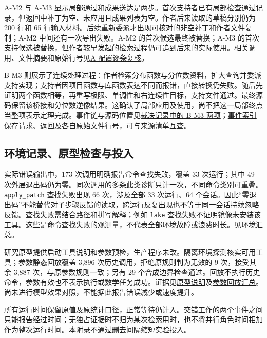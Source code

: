 A-M2 与 A-M3 显示局部通过和成果送达是两步。首次支持者已有局部检查通过记录，但返回中补丁为空、未应用且成果列表为空。作者后来读取的草稿分别仍为 200 行和 65 行输入材料。后续重新委派才出现可核对的非空补丁和作者文件复制；A-M2 中间还有一次导出失败。A-M2 的首次候选最终被替换；A-M3 的首次支持候选被替换，但作者较早发起的检索过程仍可追到后来的实际使用。相关调用、文件摘要和原始行号见\href{research/semantic/review_A.json}{A 配置逐条复核}。

B-M3 则展示了连续处理过程：作者检索分布函数与分位数资料，扩大查询并委派支持实现；支持者因项目函数与库函数表达不同而报错，直接转换仍失败。随后先证明两个函数相等，再重写极限、单调性和右连续性目标，支持文件通过。最终源码保留该桥接和分位数逆像结果。这确认了局部应用及使用，尚不把这一局部终点当整项表示定理完成。事件链与源码位置见\href{research/semantic/adjudicated_annotations.json}{裁决记录中的 B-M3 两项}；\href{research/extraction/events.jsonl}{事件索引}保存请求、返回及各自原始文件行号，可与\href{research/extraction/source_manifest.json}{来源清单}互查。

\subsection[环境记录、原型检查与投入]{\texorpdfstring{\protect\hypertarget{s4}{}环境记录、原型检查与投入}{环境记录、原型检查与投入}}
实际错误输出中，173 次调用明确报告命令查找失败，覆盖 33 次运行；其中 49 次外层退出码仍为零。同次调用的多条此类诊断只计一次，不同命令类别可重叠。\nolinkurl{apply_patch} 查找失败出现 66 次，涉及全部 33 次运行、64 个会话。因此“零退出码”不能替代对子步骤反馈的读取，跨运行反复出现也不等于同一会话持续忽略反馈。查找失败需结合路径和拼写解释；例如 \nolinkurl{lake} 查找失败不证明镜像未安装该工具。这些是命令查找失败的观测量，不代表全部环境故障或浪费时长。见\href{research/analysis/environment_summary.json}{环境汇总}。

研究原型提供启动工具说明和参数预检，生产程序未改。隔离环境探测核实可用工具；参数静态回放覆盖 3,896 次历史调用，拒绝原规则判为无效的 9 次，接受其余 3,887 次，与原参数规则一致；另有 29 个合成边界检查通过。回放不执行历史命令，参数有效也不表示执行或数学任务成功。证据见\href{research/interventions/README.zh-CN.md}{原型说明}及\href{research/interventions/argument_replay/summary.json}{参数回放汇总}。尚未进行模型效果对照，不能据此报告错误减少或速度提升。

所有运行时间保留原值及原统计口径，正常等待仍计入。交错工作的两个事件之间只能报告经过时间；无独占证据时不归为某次检索用时，也不将并行角色时间相加作为整次运行时间。本附录不通过删去间隔缩短实验投入。

